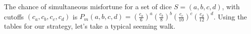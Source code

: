 \documentclass[11pt, oneside]{article} 	%
\begin{document}
The chance of simultaneous misfortune for a set of dice $S=(a,b,c,d)$, with cutoffs $(c_a, c_b, c_c, c_d)$ is $P_m(a,b,c,d) = (\frac{c_a}{6})^a (\frac{c_b}{8})^b (\frac{c_c}{10})^c (\frac{c_d}{12})^d$.  Using the tables for our strategy, let's take a typical seeming walk.
\begin{comment}
\begin{itemize}
\item 15 dice.  $S = (12, 1, 1, 1).  P_m(S) = (5/6)^{12}*7/8*9/10*11/12 = 0.081.$  &  $(2, 0.125, 0.1, 0.083)$
\item 13 dice. $S = (10, 1, 1, 1). P_m(S) = (5/6)^{10}*7/8*9/10*11/12 = 0.117$.  &  $(3.67, 0.25, 0.2, 0.166)$
\item 11 dice. $S =  (8,1,1,1).  P_m(S) = (5/6)^8*7/8*9/10*10/12  = 0.153$.  &  $(5, .375, .3, .25)$
\item 10 dice. $S= (7,1,1,1).  P_m(S) = (5/6)^7*7/8*8/10*10/12 = .163$.  &  $(6.17, .5, .4, .33)$.  Take off at .5.
\item 8 dice. $S= (6,0,1,1).  P_m(S) = (5/6)^6*8/10*10/12 = .223.$.  &  $(7.17, .625, .5, .42)$.  Keep on at .5.
\item 7 dice. $S= (5, 0, 1, 1).   P_m(S) = (5/6)^5*8/10*10/12 = .268$.  &  $(8, .75, .6, .5)$.  Take off at .5.
\item 4 dice. $S= (4,0,0,0)   P_m(S) = (4/6)^4 = .198.$  &  $(8.66, ...)$
\item 3 dice. $S= (3,0,0,0)   P_m(S) = (4/6)^3 = .297.$  &  $(9.16, ...)$
\item 2 dice. $S= (2,0,0,0)   P_m(S) = (3/6)^2 = .25.$  &  $(9.5, ...)$
\item 1 die. $S= (1,0,0,0) $.  There is no misfortune here.  
\end{itemize}
\end{comment}
\end{document}
